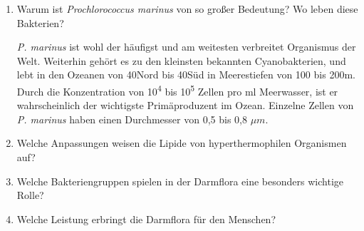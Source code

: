 \begin{enumerate}
	\item Warum ist \emph{Prochlorococcus marinus} von so großer Bedeutung? Wo leben diese Bakterien?

		\emph{P. marinus} ist wohl der häufigst und am weitesten verbreitet Organismus der Welt.
		Weiterhin gehört es zu den kleinsten bekannten Cyanobakterien, 
		und lebt in den Ozeanen von 40\textdegree Nord bis 40\textdegree Süd in Meerestiefen von 100 bis 200m.
		Durch die Konzentration von 10\textsuperscript{4} bis 10\textsuperscript{5} Zellen pro ml Meerwasser,
		ist er wahrscheinlich der wichtigste Primäproduzent im Ozean.
		Einzelne Zellen von \emph{P. marinus} haben einen Durchmesser von 0,5 bis 0,8 \begin{math}\mu m\end{math}.

	\item Welche Anpassungen weisen die Lipide von hyperthermophilen Organismen auf?
	\item Welche Bakteriengruppen spielen in der Darmflora eine besonders wichtige Rolle?
	\item Welche Leistung erbringt die Darmflora für den Menschen?
\end{enumerate}
